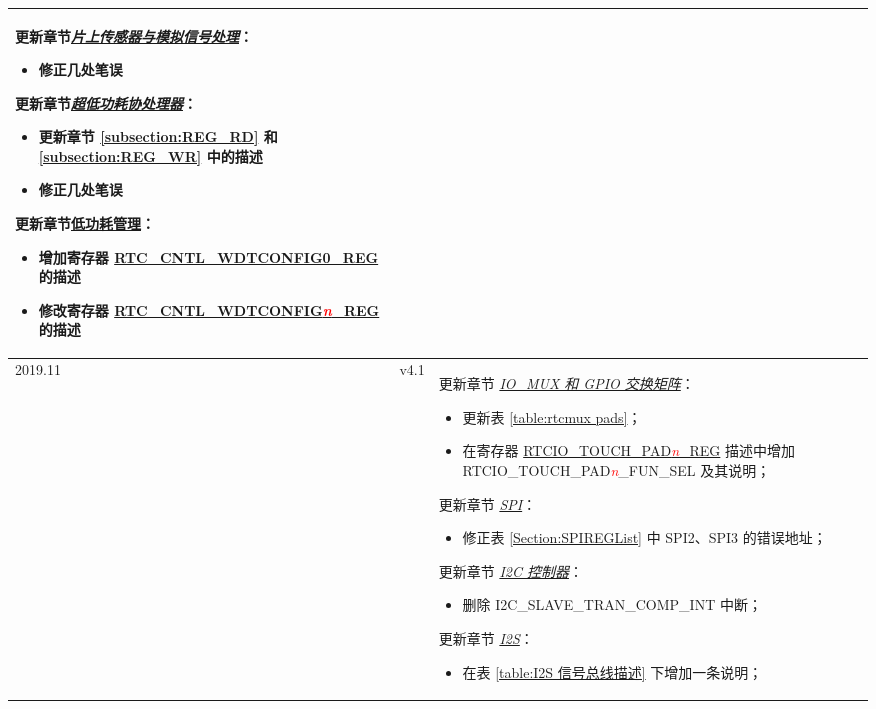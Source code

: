 \begin{longtable}[l]{ | m{2cm} | m{1.5cm} | m{12cm} | }
更新章节\hyperref[mod:sensor]{\it{片上传感器与模拟信号处理}}：
\begin{itemize}
\item 修正几处笔误
\end{itemize}

更新章节\hyperref[mod:ulp]{\it{超低功耗协处理器}}：
\begin{itemize}
\item 更新章节 \ref{subsection:REG_RD} 和 \ref{subsection:REG_WR} 中的描述
\item 修正几处笔误
\end{itemize}

更新章节\hyperref[mod:lowpowm]{低功耗管理}：
\begin{itemize}
\item 增加寄存器 \hyperref[regdesc:RTCCNTLWDTCONFIG0REG]{RTC\_CNTL\_WDTCONFIG0\_REG} 的描述
\item 修改寄存器 \hyperref[regdesc:RTCCNTLWDTCONFIGnREG]{RTC\_CNTL\_WDTCONFIG\textcolor{red}{\it{n}}\_REG} 的描述
\end{itemize}
\vspace{-1em}
\\\hline

2019.11 &v4.1 &
更新章节 \hyperref[mod:iomuxgpio]{\it{IO\_MUX 和 GPIO 交换矩阵}}：
\begin{itemize}
\item 更新表 \ref{table:rtcmux pads}；
\item 在寄存器 \hyperref[regdesc:RTCIOTOUCHPADnREG]{{RTCIO\_TOUCH\_PAD\textcolor{red}{\it{n}}\_REG}} 描述中增加 RTCIO\_TOUCH\_PAD\textcolor{red}{\it{n}}\_FUN\_SEL 及其说明；
\end{itemize}

更新章节 \hyperref[mod:spi]{\it{SPI}}：
\begin{itemize}
\item 修正表 \ref{Section:SPIREGList} 中 SPI2、SPI3 的错误地址；
\end{itemize}

更新章节 \hyperref[mod:i2c]{\it{I2C 控制器}}：
\begin{itemize}
\item 删除 I2C\_SLAVE\_TRAN\_COMP\_INT 中断；
\end{itemize}

更新章节 \hyperref[mod:i2s]{\it{I2S}}：
\begin{itemize}
\item 在表 \ref{table:I2S 信号总线描述} 下增加一条说明；
\end{itemize}


\end{longtable}
